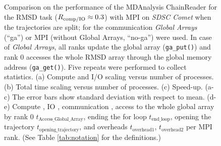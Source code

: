 \begin{figure}[!htb]
\caption{Comparison on the performance of the MDAnalysis ChainReader for the RMSD task ($R_{\text{comp/IO}} \approx 0.3$)  with MPI on \emph{SDSC Comet} when the trajectories are split; for the communication \emph{Global Arrays} (``ga'') or MPI (without Global Arrays, ``no-ga'') were used.
In case of \emph{Global Arrays}, all ranks update the global array (\texttt{ga\_put()}) and rank 0 accesses the whole RMSD array through the global memory address (\texttt{ga\_get()}).
Five repeats were performed to collect statistics.
(a) Compute and I/O scaling versus number of processes.
(b) Total time scaling versus number of processes.
(c) Speed-up.
(a-c) The error bars show standard deviation with respect to mean.
(d-e) Compute \tcomp, IO \tIO, communication \tcomm, access to the whole global array by rank 0 $t_{\text{Access\_Global\_Array}}$, ending the for loop $t_{\text{end\_loop}}$,  opening the trajectory $t_{\text{opening\_trajectory}}$, and overheads $t_{\text{overhead1}}$, $t_{\text{overhead2}}$ per MPI rank. (See Table \ref{tab:notation} for the definitions.)}
\label{fig:MPIwithIO-split-chain-reader}
\end{figure}

